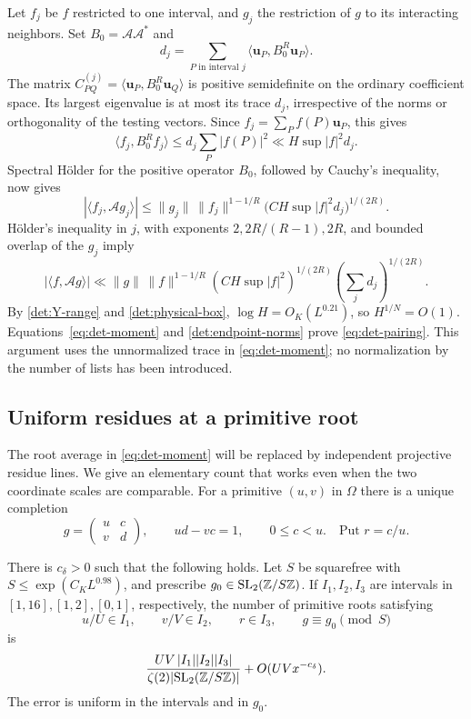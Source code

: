 Let $f_j$ be $f$ restricted to one interval, and $g_j$ the
restriction of $g$ to its interacting neighbors.  Set
$B_0=\mathcal A\mathcal A^*$ and
\[
 d_j=\sum_{P\text{ in interval }j}
              \langle\mathbf u_P,B_0^R\mathbf u_P\rangle.
\]
The matrix $C^{(j)}_{PQ}=\langle\mathbf u_P,B_0^R\mathbf u_Q\rangle$
is positive semidefinite on the ordinary coefficient space.
Its largest eigenvalue is at most its trace $d_j$, irrespective
of the norms or orthogonality of the testing vectors.  Since
$f_j=\sum_P f(P)\mathbf u_P$, this gives
\begin{equation}\label{det:compression}
 \langle f_j,B_0^Rf_j\rangle
      \leq d_j\sum_P|f(P)|^2
      \ll H\sup|f|^2d_j.
\end{equation}
Spectral H\"older for the positive operator $B_0$, followed by
Cauchy's inequality, now gives
\[
 |\langle f_j,\mathcal A g_j\rangle|
 \leq \|g_j\|\,\|f_j\|^{1-1/R}
             \bigl(CH\sup|f|^2d_j\bigr)^{1/(2R)}.
\]
H\"older's inequality in $j$, with exponents
$2,2R/(R-1),2R$, and bounded overlap of the $g_j$ imply
\[
 |\langle f,\mathcal A g\rangle|
 \ll\|g\|\,\|f\|^{1-1/R}
       (CH\sup|f|^2)^{1/(2R)}
       \left(\sum_jd_j\right)^{1/(2R)}.
\]
By \eqref{det:Y-range} and \eqref{det:physical-box},
$\log H=O_K(L^{0.21})$, so $H^{1/N}=O(1)$.
Equations~\eqref{eq:det-moment} and
\eqref{det:endpoint-norms} prove \eqref{eq:det-pairing}.
This argument uses the unnormalized trace in
\eqref{eq:det-moment}; no normalization by the number of lists
has been introduced.

\subsection{Uniform residues at a primitive root}

The root average in \eqref{eq:det-moment} will be replaced by
independent projective residue lines.  We give an elementary
count that works even when the two coordinate scales are
comparable.  For a primitive $(u,v)$ in $\Omega$ there is a
unique completion
\begin{equation}\label{det:root-matrix}
 g=\begin{pmatrix}u&c\\v&d\end{pmatrix},\qquad
 ud-vc=1,\qquad 0\leq c<u.
 \quad\text{Put }r=c/u.
\end{equation}

\begin{lemma}\label{lem:root-residue}
There is $c_\delta>0$ such that the following holds.  Let $S$ be
squarefree with $S\leq\exp(C_KL^{0.98})$, and prescribe
$g_0\in\mathrm{SL}_2(\mathbb Z/S\mathbb Z)$.  If $I_1,I_2,I_3$ are intervals
in $[1,16],[1,2],[0,1]$, respectively, the number of primitive
roots satisfying
\[
 u/U\in I_1,\qquad v/V\in I_2,\qquad r\in I_3,
 \qquad g\equiv g_0\pmod S
\]
is
\begin{equation}\label{det:root-residue-count}
 \frac{UV\,|I_1||I_2||I_3|}
      {\zeta(2)|\mathrm{SL}_2(\mathbb Z/S\mathbb Z)|}
             +O(UVx^{-c_\delta}).
\end{equation}
The error is uniform in the intervals and in $g_0$.
\end{lemma}

